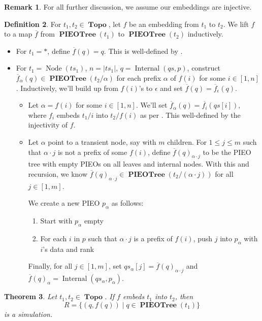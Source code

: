 \documentclass{amsart}
\DeclareMathOperator{\Topo}{\mathbf{Topo}}
\DeclareMathOperator{\PIEOTree}{\mathbf{PIEOTree}}
\DeclareMathOperator{\Internal}{\mathrm{Internal}}
\DeclareMathOperator{\Node}{\mathrm{Node}}
\newtheorem{thm}{Theorem}[section]
\theoremstyle{definition}
\newtheorem{dfn}[thm]{Definition}
\newtheorem{rem}[thm]{Remark}
\begin{document}
\begin{rem}
    For all further discussion, we assume our embeddings are injective.
\end{rem}

\begin{dfn}
    For $t_1, t_2 \in \Topo$, let $f$ be an embedding from $t_1$ to $t_2$.
    We lift $f$ to a map $\overline{f}$ from $\PIEOTree(t_1)$ to $\PIEOTree(t_2)$ inductively.
    \begin{itemize}
        \item For $t_1 = \ast$, define $\overline{f}(q) = q$. This is well-defined by \cite[Lemma ~5.2]{OG}.
        \item For $t_1 = \Node(ts_1)$, $n = |ts_1|$, $q = \Internal(qs, p)$, 
            construct $\overline{f}_{\alpha}(q) \in \PIEOTree(t_2/\alpha)$ for each prefix $\alpha$ of $f(i)$ for some $i \in [1,n]$.
            Inductively, we'll build up from $f(i)$'s to $\epsilon$ and set $\overline{f}(q) = \overline{f}_\epsilon(q)$.
            \begin{itemize}
                \item Let $\alpha = f(i)$ for some $i \in [1,n]$. We'll set $\overline{f}_\alpha(q) = \overline{f_i}(qs[i])$, 
                    where $f_i$ embeds $t_1/i$ into $t_2/f(i)$ as per \cite[Lemma 5.2]{OG}.
                    This well-defined by the injectivity of $f$.
                \item Let $\alpha$ point to a transient node, say with $m$ children.
                    For $1 \leq j \leq m$ such that $\alpha \cdot j$ is not a prefix of some $f(i)$, 
                    define $\overline{f}(q)_{\alpha \cdot j}$ to be the PIEO tree with empty PIEOs on all leaves and internal nodes. 
                    With this and recursion, we know $\overline{f}(q)_{\alpha \cdot j} \in \PIEOTree(t_2/(\alpha \cdot j))$ for all $j \in [1, m]$.

                    We create a new PIEO $p_\alpha$ as follows:
                    \begin{enumerate} 
                        \item Start with $p_\alpha$ empty
                        \item For each $i$ in $p$ such that $\alpha \cdot j$ is a prefix of $f(i)$, push $j$ into $p_\alpha$ with $i$'s data and rank
                    \end{enumerate}

                    Finally, for all $j \in [1,m]$, set $qs_\alpha[j] = \overline{f}(q)_{\alpha \cdot j}$ and $\overline{f}(q)_\alpha = \Internal(qs_\alpha, p_\alpha)$.
            \end{itemize}
    \end{itemize}
\end{dfn}

\begin{thm}
    \label{thm:profit}
    Let $t_1, t_2 \in \Topo$. If $f$ embeds $t_1$ into $t_2$, then 
    $$R = \{(q, f(q)) \mid q \in \PIEOTree(t_1)\}$$ 
    is a simulation.
\end{thm}

\newpage 

\renewcommand\refname{\LARGE References}
 

\end{document}
